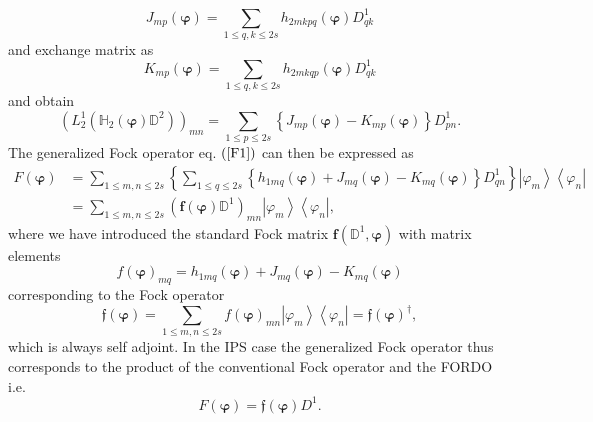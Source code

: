 \documentclass[aps,preprint]{revtex4}%
\begin{document}
\begin{equation}
J_{mp}\left(  \bm{\varphi}\right)  =\sum_{1\leq q,k\leq2s}h_{2mkpq}\left(
\bm{\varphi}\right)  D_{qk}^{1}%
\end{equation}
and exchange matrix as
\begin{equation}
K_{mp}\left(  \bm{\varphi}\right)  =\sum_{1\leq q,k\leq2s}h_{2mkqp}\left(
\bm{\varphi}\right)  D_{qk}^{1}%
\end{equation}
and obtain
\begin{equation}
\left(  L_{2}^{1}\left(  \mathbb{H}_{2}\left(  \bm{\varphi}\right)
\mathbb{D}^{2}\right)  \right)  _{mn}=\sum_{1\leq p\leq2s}\left\{
J_{mp}\left(  \bm{\varphi}\right)  -K_{mp}\left(  \bm{\varphi}\right)
\right\}  D_{pn}^{1}.
\end{equation}
The generalized Fock operator eq. $\left(  \ref{F1}\right)  $ can then be
expressed as
\begin{align}
F\left(  \bm{\varphi}\right)   &  =\sum_{1\leq m,n\leq2s}\left\{  \sum_{1\leq
q\leq2s}\left\{  h_{1mq}\left(  \bm{\varphi}\right)  +J_{mq}\left(
\bm{\varphi}\right)  -K_{mq}\left(  \bm{\varphi }\right)  \right\}  D_{qn}%
^{1}\right\}  \left\vert \varphi_{m}\right\rangle \left\langle \varphi
_{n}\right\vert \nonumber\\
&  =\sum_{1\leq m,n\leq2s}\left(  \bm{f}\left(  \bm{\varphi}\right)
\mathbb{D}^{1}\right)  _{mn}\left\vert \varphi_{m}\right\rangle \left\langle
\varphi_{n}\right\vert ,
\end{align}
where we have introduced the standard Fock matrix $\bm{f}\left(
\mathbb{D}^{1},\bm{\varphi}\right)  $ with matrix elements
\begin{equation}
f\left(  \bm{\varphi}\right)  _{mq}=h_{1mq}\left(  \bm{\varphi }\right)
+J_{mq}\left(  \bm{\varphi}\right)  -K_{mq}\left(  \bm{\varphi}\right)
\end{equation}
corresponding to the Fock operator
\begin{equation}
\mathfrak{f}\left(  \bm{\varphi}\right)  =\sum_{1\leq m,n\leq2s}f\left(
\bm{\varphi}\right)  _{mn}\left\vert \varphi_{m}\right\rangle \left\langle
\varphi_{n}\right\vert =\mathfrak{f}\left(  \bm{\varphi}\right)  ^{\dagger},
\end{equation}
which is always self adjoint. In the IPS case the generalized Fock operator
thus corresponds to the product of the conventional Fock operator and the
FORDO i.e.
\begin{equation}
F\left(  \bm{\varphi}\right)  =\mathfrak{f}\left(  \bm{\varphi }\right)
D^{1}.
\end{equation}
\end{document}
